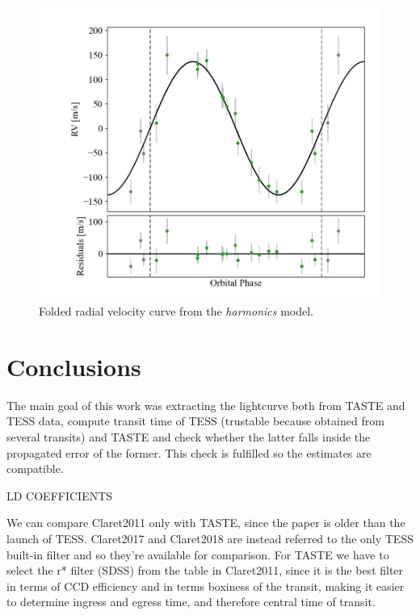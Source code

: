 \documentclass[a4paper,11pt,twocolumn]{article}
\begin{document}
\begin{figure}[h]
	\centering
	\includegraphics[scale=0.25, angle=0]{../pictures/RV/RV2.png}
	\caption{Folded radial velocity curve from the \textit{harmonics} model.}
	\label{fig:RV2}
\end{figure}




\newpage

\section{Conclusions}
The main goal of this work was extracting the lightcurve both from TASTE
and TESS data, compute transit time of TESS (trustable because obtained 
from several transits) and TASTE and check whether the latter falls inside 
the propagated error of the former. This check is fulfilled so the estimates 
are compatible.







LD COEFFICIENTS

We can compare Claret2011 only with TASTE, since the paper is older 
than the launch of TESS. Claret2017 and Claret2018 are instead referred
to the only TESS built-in filter and so they're available for 
comparison.
For TASTE we have to select the r* filter (SDSS) from the table in Claret2011,
since it is the best filter in terms of CCD efficiency and in terms 
boxiness of the transit, making it easier to determine ingress and egress 
time, and therefore central time of transit.
\end{document}
